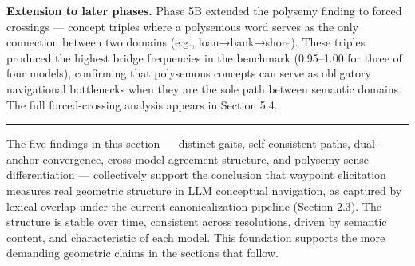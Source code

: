 \textbf{Extension to later phases.} Phase 5B extended the polysemy finding to forced crossings --- concept triples where a polysemous word serves as the only connection between two domains (e.g., loan→bank→shore). These triples produced the highest bridge frequencies in the benchmark (0.95--1.00 for three of four models), confirming that polysemous concepts can serve as obligatory navigational bottlenecks when they are the sole path between semantic domains. The full forced-crossing analysis appears in Section 5.4.

\begin{center}\rule{0.5\linewidth}{0.5pt}\end{center}

The five findings in this section --- distinct gaits, self-consistent paths, dual-anchor convergence, cross-model agreement structure, and polysemy sense differentiation --- collectively support the conclusion that waypoint elicitation measures real geometric structure in LLM conceptual navigation, as captured by lexical overlap under the current canonicalization pipeline (Section 2.3). The structure is stable over time, consistent across resolutions, driven by semantic content, and characteristic of each model. This foundation supports the more demanding geometric claims in the sections that follow.
